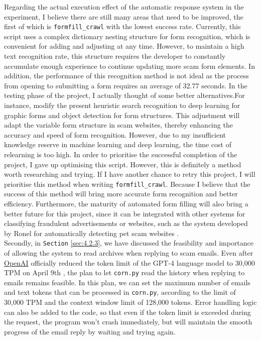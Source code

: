 \documentclass[ oneside,%
                    author={Cassie Qing Tang},
                    degree={BSc},
                     title={An Automated Response System for Disrupting Online Pet Scamming \\ },
                    subtitle={ }]{dissertation}
\begin{document}
Regarding the actual execution effect of the automatic response system in the experiment, I believe there are still many areas that need to be improved, the first of which is \texttt{formfill\_crawl} with the lowest success rate. Currently, this script uses a complex dictionary nesting structure for form recognition, which is convenient for adding and adjusting at any time. However, to maintain a high text recognition rate, this structure requires the developer to constantly accumulate enough experience to continue updating more scam form elements. In addition, the performance of this recognition method is not ideal as the process from opening to submitting a form requires an average of 32.77 seconds. In the testing phase of the project, I actually thought of some better alternatives.For instance, modify the present heuristic search recognition to deep learning for graphic forms and object detection for form structures. This adjustment will adapt the variable form structure in scam websites, thereby enhancing the accuracy and speed of form recognition. However, due to my insufficient knowledge reserve in machine learning and deep learning, the time cost of relearning is too high. In order to prioritise the successful completion of the project, I gave up optimising this script. However, this is definitely a method worth researching and trying. If I have another chance to retry this project, I will prioritise this method when writing \texttt{formfill\_crawl}. Because I believe that the success of this method will bring more accurate form recognition and better efficiency. Furthermore, the maturity of automated form filling will also bring a better future for this project, since it can be integrated with other systems for classifying fraudulent advertisements or websites, such as the system developed by Ronel for automatically detecting pet scam websites \cite{mehmedov_automated_2021}.
\\

Secondly, in \texttt{Section} \ref{sec:4.2.3}, we have discussed the feasibility and importance of allowing the system to read archives when replying to scam emails. Even after \href{https://openai.com/}{OpenAI} officially reduced the token limit of the GPT-4 language model to 30,000 TPM on April 9th \cite{noauthor_openai_nodate}, the plan to let \texttt{corn.py} read the history when replying to emails remains feasible. In this plan, we can set the maximum number of emails and text tokens that can be processed in \texttt{corn.py}, according to the limit of 30,000 TPM and the context window limit of 128,000 tokens. Error handling logic can also be added to the code, so that even if the token limit is exceeded during the request, the program won't crash immediately, but will maintain the smooth progress of the email reply by waiting and trying again.
\\
\end{document}
